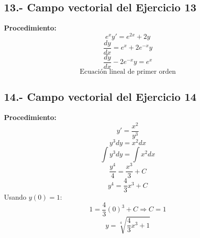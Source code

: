 \documentclass[12pt]{article}
\begin{document}
\vspace{1cm}

\subsection*{13.- Campo vectorial del Ejercicio 13}
\begin{minipage}[t]{0.5\textwidth}
\textbf{Procedimiento:}
\[
e^x y' = e^{2x}+2y
\]
\[
\frac{dy}{dx}=e^x+2e^{-x}y
\]
\[
\frac{dy}{dx}-2e^{-x}y=e^x
\]
\[
\text{Ecuaci\'on lineal de primer orden}
\]
\end{minipage}
\hfill
\begin{minipage}[t]{0.45\textwidth}
\begin{center}
\end{center}
\end{minipage}

\vspace{1cm}

\subsection*{14.- Campo vectorial del Ejercicio 14}
\begin{minipage}[t]{0.5\textwidth}
\textbf{Procedimiento:}
\[
y' = \frac{x^2}{y^3}
\]
\[
y^3dy=x^2dx
\]
\[
\int y^3dy = \int x^2dx
\]
\[
\frac{y^4}{4}=\frac{x^3}{3}+C
\]
\[
y^4=\frac{4}{3}x^3+C
\]
Usando $y(0)=1$:
\[
1 = \frac{4}{3}(0)^3 + C \Rightarrow C=1
\]
\[
y = \sqrt[4]{\frac{4}{3}x^3+1}
\]
\end{minipage}
\hfill
\begin{minipage}[t]{0.45\textwidth}
\begin{center}
\end{center}
\end{minipage}
\end{document}
